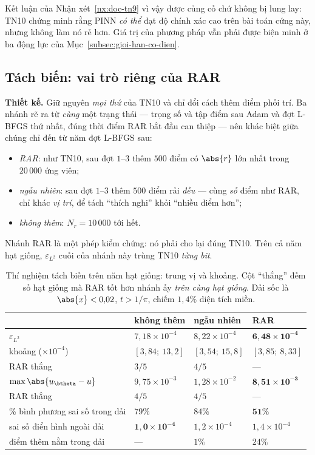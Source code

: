 Kết luận của Nhận xét~\ref{nx:doc-tn9} vì vậy được củng cố chứ không bị lung
lay: TN10 chứng minh rằng PINN \emph{có thể} đạt độ chính xác cao trên bài toán
cứng này, nhưng không làm nó rẻ hơn. Giá trị của phương pháp vẫn phải được biện
minh ở ba động lực của Mục~\ref{subsec:gioi-han-co-dien}.

\subsection{Tách biến: vai trò riêng của RAR}
\label{subsec:tn10-tachbien}

\textbf{Thiết kế.} Giữ nguyên \emph{mọi thứ} của TN10 và chỉ đổi cách thêm điểm
phối trí. Ba nhánh rẽ ra từ \emph{cùng} một trạng thái --- trọng số và tập điểm
sau Adam và đợt L-BFGS thứ nhất, đúng thời điểm RAR bắt đầu can thiệp --- nên
khác biệt giữa chúng chỉ đến từ năm đợt L-BFGS sau:
\begin{itemize}[leftmargin=2.2em,itemsep=2pt]
\item \emph{RAR}: như TN10, sau đợt $1$--$3$ thêm $500$ điểm có $\abs{r}$ lớn
  nhất trong $20\,000$ ứng viên;
\item \emph{ngẫu nhiên}: sau đợt $1$--$3$ thêm $500$ điểm rải \emph{đều} ---
  cùng \emph{số} điểm như RAR, chỉ khác \emph{vị trí}, để tách ``thích nghi''
  khỏi ``nhiều điểm hơn'';
\item \emph{không thêm}: $N_r = 10\,000$ tới hết.
\end{itemize}
Nhánh RAR là một phép kiểm chứng: nó phải cho lại đúng TN10. Trên cả năm hạt
giống, $\varepsilon_{L^2}$ cuối của nhánh này trùng TN10 \emph{từng bit}.

\begin{table}[H]
\centering
\caption[Tách biến vai trò của RAR]{Thí nghiệm tách biến trên năm hạt giống:
trung vị và khoảng. Cột ``thắng'' đếm số hạt giống mà RAR tốt hơn nhánh ấy
\emph{trên cùng hạt giống}. Dải sốc là $\abs{x} < 0{,}02$, $t > 1/\pi$, chiếm
$1{,}4\%$ diện tích miền.}
\label{tab:tn10b}
\footnotesize
\begin{tabular}{@{}l l l l@{}}
\toprule
& \textbf{không thêm} & \textbf{ngẫu nhiên} & \textbf{RAR} \\
\midrule
$\varepsilon_{L^2}$ & $7{,}18\times10^{-4}$ & $8{,}22\times10^{-4}$
  & $\mathbf{6{,}48\times10^{-4}}$ \\
\quad khoảng ($\times10^{-4}$) & $[3{,}84;\ 13{,}2]$ & $[3{,}54;\ 15{,}8]$
  & $[3{,}85;\ 8{,}33]$ \\
\quad RAR thắng & $3/5$ & $4/5$ & --- \\
\addlinespace
$\max\abs{u_{\btheta} - u}$ & $9{,}75\times10^{-3}$ & $1{,}28\times10^{-2}$
  & $\mathbf{8{,}51\times10^{-3}}$ \\
\quad RAR thắng & $4/5$ & $4/5$ & --- \\
\addlinespace
\% bình phương sai số trong dải & $79\%$ & $84\%$ & $\mathbf{51\%}$ \\
sai số điển hình ngoài dải & $\mathbf{1{,}0\times10^{-4}}$ & $1{,}2\times10^{-4}$
  & $1{,}4\times10^{-4}$ \\
điểm thêm nằm trong dải & --- & $1\%$ & $24\%$ \\
\bottomrule
\end{tabular}
\end{table}

